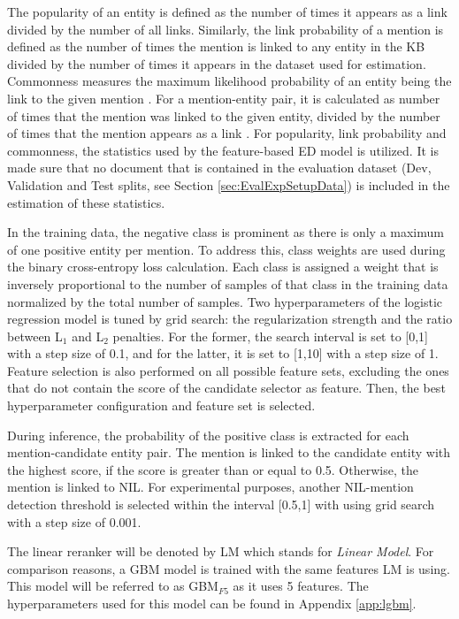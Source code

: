 \documentclass{report}
\theoremstyle{definition}
\theoremstyle{remark}
\begin{document}
The popularity of an entity is defined as the number of times it appears as a link divided by the number of all links. Similarly, the link probability \cite{balog} of a mention is defined as the number of times the mention is linked to any entity in the KB divided by the number of times it appears in the dataset used for estimation. Commonness measures the maximum likelihood probability of an entity being the link to the given mention \cite{balog}. For a mention-entity pair, it is calculated as number of times that the mention was linked to the given entity, divided by the number of times that the mention appears as a link \cite{balog}. For popularity, link probability and commonness, the statistics used by the feature-based ED model is utilized. It is made sure that no document that is contained in the evaluation dataset (Dev, Validation and Test splits, see Section \ref{sec:EvalExpSetupData}) is included in the estimation of these statistics.

In the training data, the negative class is prominent as there is only a maximum of one positive entity per mention. To address this, class weights are used during the binary cross-entropy loss calculation. Each class is assigned a weight that is inversely proportional to the number of samples of that class in the training data normalized by the total number of samples. Two hyperparameters of the logistic regression model is tuned by grid search: the regularization strength and the ratio between L$_1$ and L$_2$ penalties. For the former, the search interval is set to [0,1] with a step size of 0.1, and for the latter, it is set to [1,10] with a step size of 1. Feature selection is also performed on all possible feature sets, excluding the ones that do not contain the score of the candidate selector as feature. Then, the best hyperparameter configuration and feature set is selected.

During inference, the probability of the positive class is extracted for each mention-candidate entity pair. The mention is linked to the candidate entity with the highest score, if the score is greater than or equal to 0.5. Otherwise, the mention is linked to NIL. For experimental purposes, another NIL-mention detection threshold is selected within the interval [0.5,1] with using grid search with a step size of 0.001. 

The linear reranker will be denoted by LM which stands for \textit{Linear Model}. For comparison reasons, a GBM model is trained with the same features LM is using. This model will be referred to as GBM$_{F5}$ as it uses 5 features. The hyperparameters used for this model can be found in Appendix \ref{app:lgbm}.
\end{document}
